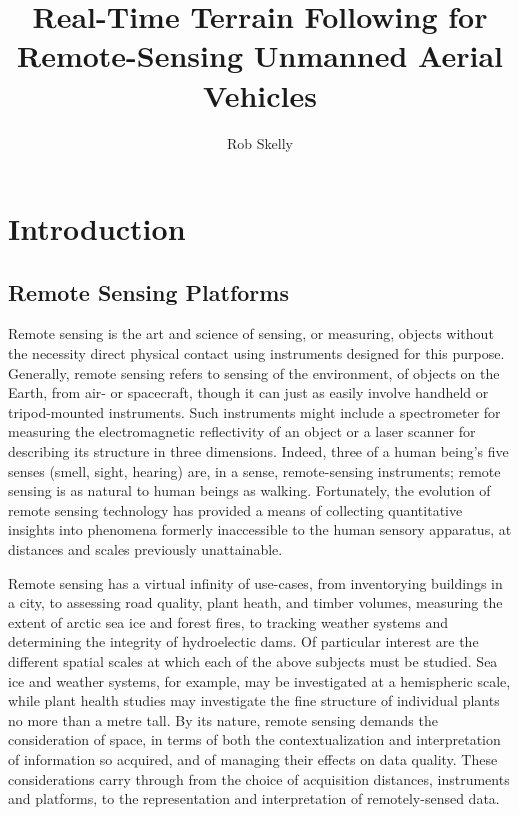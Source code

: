 \documentclass[10pt,a4paper]{report}
\author{Rob Skelly}
\title{Real-Time Terrain Following for Remote-Sensing Unmanned Aerial Vehicles}
\begin{document}
\maketitle

\section{Introduction}

\subsection{Remote Sensing Platforms}

Remote sensing is the art and science of sensing, or measuring, objects without the necessity direct physical contact using instruments designed for this purpose. Generally, remote sensing refers to sensing of the environment, of objects on the Earth, from air- or spacecraft, though it can just as easily involve handheld or tripod-mounted instruments. Such instruments might include a spectrometer for measuring the electromagnetic reflectivity of an object or a laser scanner for describing its structure in three dimensions. Indeed, three of a human being’s five senses (smell, sight, hearing) are, in a sense, remote-sensing instruments; remote sensing is as natural to human beings as walking. Fortunately, the evolution of remote sensing technology has provided a means of collecting quantitative insights into phenomena formerly inaccessible to the human sensory apparatus, at distances and scales previously unattainable.

Remote sensing has a virtual infinity of use-cases, from inventorying buildings in a city, to assessing road quality, plant heath, and timber volumes, measuring the extent of arctic sea ice and forest fires, to tracking weather systems  and determining the integrity of hydroelectic dams. Of particular interest are the different spatial scales at which each of the above subjects must be studied. Sea ice and weather systems, for example, may be investigated at a hemispheric scale, while plant health studies may investigate the fine structure of individual plants no more than a metre tall. By its nature, remote sensing demands the consideration of space, in terms of both the contextualization and  interpretation of information so acquired, and of managing their effects on data quality. These considerations carry through from the choice of acquisition distances, instruments and platforms, to the representation and interpretation of remotely-sensed data.
\end{document}
